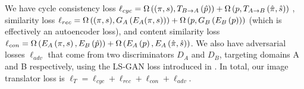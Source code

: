 \documentclass{article}
\begin{document}


		We have cycle consistency loss ${\ell_{cyc}  =  \Omega\left((\pi,s),T_{B\rightarrow A}\left(\hat{p}\right)\right)  +  \Omega\left(p,T_{A\rightarrow B}\left(\hat{\pi},\hat{s}\right)\right)}$
		, similarity loss ${\ell_{rec} = \Omega\left((\pi,s),G_A\left(E_A(\pi,s)\right)\right) + \Omega\left(p,G_B\left(E_B\left(p\right)\right)\right)}$
			(which is effectively an autoencoder loss),   
		and content similarity loss ${ \ell_{con} = \Omega\left(E_A\left(\pi,s\right), E_B\left(\hat{p}\right) \right)    +   \Omega\left(E_A\left(p\right),E_A\left(\hat{\pi},\hat{s}\right)\right) }$.
		We also have adversarial losses $\ell_{adv}$ that come from two discriminators $D_A$ and $D_B$, targeting domains A and B respectively, using the LS-GAN loss introduced in \citet{lsgan}. 
		In total, our image translator loss is $\ell_T=\ell_{cyc}+\ell_{rec}+\ell_{con}+\ell_{adv}$.


				
\end{document}
